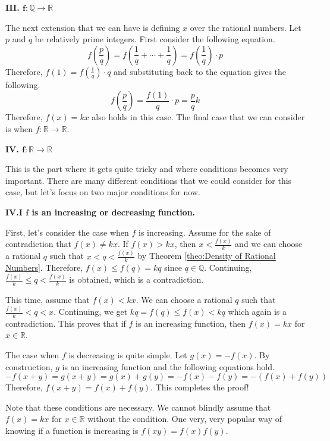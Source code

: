 \documentclass[../../main.tex]{subfiles}
\begin{document}
{\Large\textcolor{BrickRed}
{\textbf{III. $\mathbf{f: \mathbb{Q} \to \mathbb{R}}$}}}

The next extension that we can have is defining $x$ over the
rational numbers. Let $p$ and $q$ be relatively prime integers.
First consider the following equation.
\[
f \left( \frac{p}{q} \right)
= f \left( \frac{1}{q} + \cdots + \frac{1}{q} \right)
= f \left( \frac{1}{q} \right) \cdot p
\]
Therefore, $f(1) = f \left( \frac{1}{q} \right) \cdot q$ and
substituting back to the equation gives the following.
\[
f \left( \frac{p}{q} \right)
= \frac{f(1)}{q} \cdot p
= \frac{p}{q} k
\]
Therefore, $f(x) = kx$ also holds in this case. The final case
that we can consider is when $f: \mathbb{R} \to \mathbb{R}$.

{\Large\textcolor{BrickRed}
{\textbf{IV. $\mathbf{f: \mathbb{R} \to \mathbb{R}}$}}}

This is the part where it gets quite tricky and where conditions
becomes very important. There are many different conditions that
we could consider for this case, but let's focus on two major
conditions for now.

{\large
\textbf{IV.I $\mathbf{f}$ is an increasing or decreasing function.}}

First, let's consider the case when $f$ is increasing. Assume for
the sake of contradiction that $f(x) \neq kx$. If $f(x) > kx$,
then $x < \frac{f(x)}{k}$ and we can choose a rational $q$
such that $x < q < \frac{f(x)}{k}$ by Theorem \ref{theo:Density of
Rational Numbers}. Therefore, $f(x) \leq f(q) = kq$ since
$q \in \mathbb{Q}$. Continuing, $\frac{f(x)}{k} \leq q <
\frac{f(x)}{k}$ is obtained, which is a contradiction.

This time, assume that $f(x) < kx$. We can choose a rational $q$
such that $\frac{f(x)}{k} < q < x$. Continuing, we get
$kq = f(q) \leq f(x) < kq$ which again is a contradiction.
This proves that if $f$ is an increasing function, then $f(x) = kx$
for $x \in \mathbb{R}$.

The case when $f$ is decreasing is quite simple. Let $g(x) = -f(x)$.
By construction, $g$ is an increasing function and the following
equations hold.
\[
-f(x + y)
= g(x + y)
= g(x) + g(y)
= -f(x) - f(y)
= -(f(x) + f(y))
\]
Therefore, $f(x + y) = f(x) + f(y)$. This completes the proof!

Note that these conditions are necessary. We cannot blindly assume
that $f(x) = kx$ for $x \in \mathbb{R}$ without the condition.
One very, very popular way of knowing if a function is increasing
is $f(xy) = f(x) f(y)$.
\end{document}
